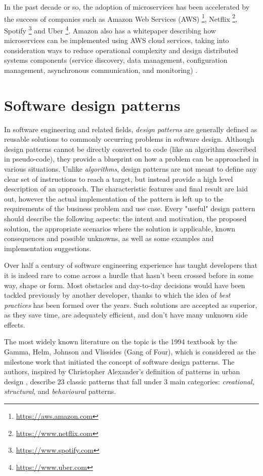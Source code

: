 In the past decade or so, the adoption of microservices has been accelerated by the success of companies such
as Amazon Web Services (AWS) \footnote{\url{https://aws.amazon.com}}, Netflix \footnote{\url{https://www.netflix.com}},
Spotify \footnote{\url{https://www.spotify.com}} and Uber \footnote{\url{https://www.uber.com}}. Amazon also
has a whitepaper describing how microservices can be implemented using AWS cloud services, taking into consideration
ways to reduce operational complexity and design distributed systems components (service discovery, data management,
configuration management, asynchronous communication, and monitoring) \cite{aws-microservices}.

\section{Software design patterns}

In software engineering and related fields, \textit{design patterns} are generally defined as reusable solutions
to commonly occurring problems in software design. Although design patterns cannot be directly converted to code
(like an algorithm described in pseudo-code), they provide a blueprint on how a problem can be approached in various
situations. Unlike \textit{algorithms}, design patterns are not meant to define any clear set of instructions to
reach a target, but instead provide a high level description of an approach. The characteristic features and final
result are laid out, however the actual implementation of the pattern is left up to the requirements of the business
problem and use case. Every "useful" design pattern should describe the following aspects: the intent and motivation,
the proposed solution, the appropriate scenarios where the solution is applicable, known consequences and possible
unknowns, as well as some examples and implementation suggestions.

Over half a century of software engineering experience has taught developers that it is indeed rare to come across
a hurdle that hasn't been crossed before in some way, shape or form. Most obstacles and day-to-day decisions would
have been tackled previously by another developer, thanks to which the idea of \textit{best practices} has been
formed over the years. Such solutions are accepted as superior, as they save time, are adequately efficient, and
don't have many unknown side effects.

The most widely known literature on the topic is the 1994 textbook \cite{gof94} by the Gamma, Helm, Johnson and
Vlissides (Gang of Four), which is considered as the milestone work that initiated the concept of software design
patterns. The authors, inspired by Christopher Alexander's definition of patterns in urban design \cite{alexander77},
describe 23 classic patterns that fall under 3 main categories: \textit{creational, structural}, and \textit{behavioural}
patterns.

